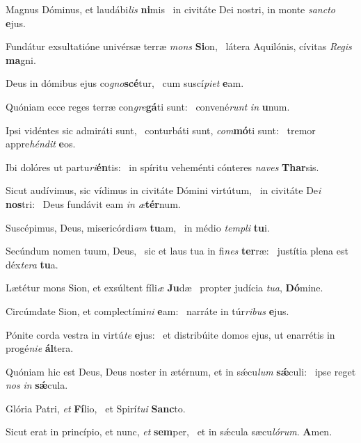 \item Magnus Dóminus, et laudábi\textit{lis} \textbf{ni}mis~\psstar{} in civitáte Dei nostri, in monte \textit{sancto} \textbf{e}jus.
\item Fundátur exsultatióne univérsæ terræ \textit{mons} \textbf{Si}on,~\psstar{} látera Aquilónis, cívitas \textit{Regis} \textbf{ma}gni.
\item Deus in dómibus ejus co\textit{gno}\textbf{scé}tur,~\psstar{} cum suscí\textit{piet} \textbf{e}am.
\item Quóniam ecce reges terræ con\textit{gre}\textbf{gá}ti sunt:~\psstar{} convené\textit{runt} \textit{in} \textbf{u}num.
\item Ipsi vidéntes sic admiráti sunt,~\pscross{} conturbáti sunt, \textit{com}\textbf{mó}ti sunt:~\psstar{} tremor appre\textit{héndit} \textbf{e}os.
\item Ibi dolóres ut partu\textit{ri}\textbf{én}tis:~\psstar{} in spíritu veheménti cónteres \textit{naves} \textbf{Thar}sis.
\item Sicut audívimus, sic vídimus in civitáte Dómini virtútum,~\pscross{} in civitáte De\textit{i} \textbf{nos}tri:~\psstar{} Deus fundávit eam \textit{in} \textit{æ}\textbf{tér}num.
\item Suscépimus, Deus, misericórdi\textit{am} \textbf{tu}am,~\psstar{} in médio \textit{templi} \textbf{tu}i.
\item Secúndum nomen tuum, Deus,~\pscross{} sic et laus tua in fi\textit{nes} \textbf{ter}ræ:~\psstar{} justítia plena est déx\textit{tera} \textbf{tu}a.
\item Lætétur mons Sion, et exsúltent fíli\textit{æ} \textbf{Ju}dæ~\psstar{} propter judícia \textit{tua}, \textbf{Dó}mine.
\item Circúmdate Sion, et complectími\textit{ni} \textbf{e}am:~\psstar{} narráte in túr\textit{ribus} \textbf{e}jus.
\item Pónite corda vestra in virtú\textit{te} \textbf{e}jus:~\psstar{} et distribúite domos ejus, ut enarrétis in progé\textit{nie} \textbf{ál}tera.
\item Quóniam hic est Deus, Deus noster in ætérnum, et in sǽcu\textit{lum} \textbf{sǽ}culi:~\psstar{} ipse reget \textit{nos} \textit{in} \textbf{sǽ}cula.
\item Glória Patri, \textit{et} \textbf{Fí}lio,~\psstar{} et Spirí\textit{tui} \textbf{Sanc}to.
\item Sicut erat in princípio, et nunc, \textit{et} \textbf{sem}per,~\psstar{} et in sǽcula sæcu\textit{lórum}. \textbf{A}men.